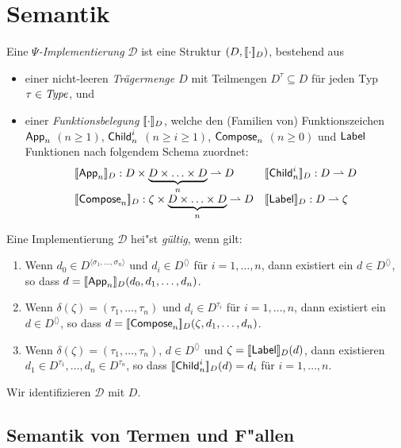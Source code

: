 \documentclass[%
  12pt,%
  a4paper,%
]{article}
\begin{document}
\section*{Semantik}

Eine \emph{$\Psi$-Implementierung} $\mathcal{D}$ ist eine Struktur $(D,[\![\cdot]\!]_D)$, bestehend aus
\begin{itemize}
\item einer nicht-leeren \emph{Tr\"agermenge $D$} mit Teilmengen $D^\tau \subseteq D$ f\"ur jeden Typ
  $\tau \in \mathit{Type}$, und
\item einer \emph{Funktionsbelegung $[\![\cdot]\!]_D$}, welche den (Familien von) Funktionszeichen
  $\mathsf{App}_n$ $(n \ge 1)$, $\mathsf{Child}_n^i$ $(n \ge i \ge 1)$, $\mathsf{Compose}_n$ $(n \ge 0)$ und $\mathsf{Label}$ Funktionen
  nach folgendem Schema zuordnet:
  \[\begin{array}{ll}
    \sem{\App_n}_D: D \times \underbrace{D \times \ldots \times D}_n \pto D &
    \sem{\Child_n^i}_D: D \pto D \\
    \sem{\Compose_n}_D: \zeta \times \underbrace{D \times \ldots \times D}_n \pto D &
    \sem{\Label}_D: D \pto \zeta \\
  \end{array}\]
\end{itemize}
Eine Implementierung $\mathcal{D}$ hei"st \emph{g\"ultig}, wenn gilt:
\begin{enumerate}
\item Wenn $d_0 \in D^{\langle \sigma_1,\ldots,\sigma_n \rangle}$ und $d_i \in D^{\langle \rangle}$ f\"ur $i=1,\ldots,n$,
  dann existiert ein $d \in D^{\langle \rangle}$, so dass $d = [\![\mathsf{App}_n]\!]_D(d_0,d_1,\ldots,d_n)$.
\item Wenn $\delta(\zeta) = (\tau_1,\ldots,\tau_n)$ und $d_i \in D^{\tau_i}$ f\"ur $i=1,\ldots,n$,
  dann existiert ein $d \in D^{\langle \rangle}$, so dass $d = [\![\mathsf{Compose}_n]\!]_D(\zeta,d_1,\ldots,d_n)$.
\item Wenn $\delta(\zeta) = (\tau_1,\ldots,\tau_n)$, $d \in D^{\langle \rangle}$ und $\zeta = [\![\mathsf{Label}]\!]_D(d)$, dann
  existieren $d_1 \in D^{\tau_1},\ldots,d_n \in D^{\tau_n}$, so dass $[\![\mathsf{Child}_n^i]\!]_D(d) = d_i$ f\"ur $i=1,\ldots,n$.
\end{enumerate}
Wir identifizieren $\mathcal{D}$ mit $D$.

\subsection*{Semantik von Termen und F"allen}
\end{document}
